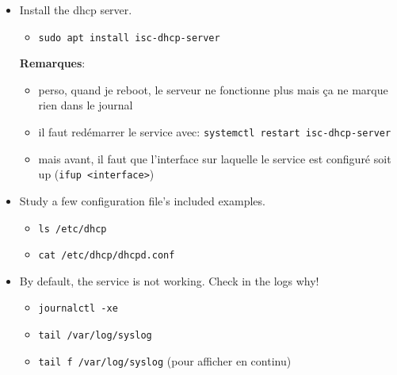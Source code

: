 \documentclass[a4paper]{article}
\begin{document}
\begin{itemize}

\item Install the dhcp server.
\begin{example}
    \begin{itemize}
        \item \texttt{sudo apt install isc-dhcp-server}
    \end{itemize}
    \textbf{Remarques}:
    \begin{itemize}
        \item perso, quand je reboot, le serveur ne fonctionne plus mais ça ne marque rien dans le journal
        \item il faut redémarrer le service avec: \texttt{systemctl restart isc-dhcp-server}
        \item mais avant, il faut que l'interface sur laquelle le service est configuré soit up (\texttt{ifup <interface>})
    \end{itemize}
\end{example}

\item Study a few configuration file’s included examples.
\begin{example}
    \begin{itemize}
        \item \texttt{ls /etc/dhcp}
        \item \texttt{cat /etc/dhcp/dhcpd.conf}
    \end{itemize}
\end{example}

\item By default, the service is not working. Check in the logs why!
\begin{example}
    \begin{itemize}
        \item \texttt{journalctl -xe}
        \item \texttt{tail /var/log/syslog}
        \item \texttt{tail f /var/log/syslog} (pour afficher en continu)
    \end{itemize}
\end{example}


\end{itemize}
\end{document}
